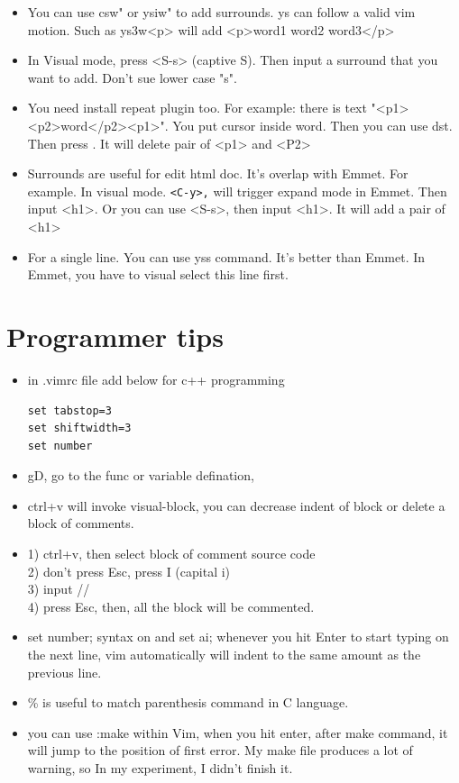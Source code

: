 \documentclass[a4paper,12pt,twoside]{book}
\begin{document}
\begin{itemize}
	   \item You can use csw" or ysiw" to add surrounds. ys can follow a valid vim motion. Such as ys3w<p> will add <p>word1 word2 word3</p>
	   \item In Visual mode, press <S-s> (captive S). Then input a surround that you want to add. Don't sue lower case "s". 
	   \item You need install repeat plugin too. For example: there is text "<p1><p2>word</p2><p1>". You put cursor inside word. Then you can use dst. Then press . It will delete pair of <p1> and <P2>
	    
	    \item Surrounds are useful for edit html doc. It's overlap with Emmet. For example. In visual mode. \verb=<C-y>,= will trigger expand mode in Emmet. Then input <h1>. Or you can use <S-s>, then input <h1>. It will add a pair of <h1> 
	    \item For a single line. You can use yss command. It's better than Emmet. In Emmet, you have to visual select this line first.  
\end{itemize}


\section{Programmer tips}
\begin{itemize}
 	\item in .vimrc file add below for c++ programming
	\begin{verbatim}
set tabstop=3
set shiftwidth=3
set number	
	\end{verbatim}
	 
	\item gD, go to the func or variable defination, \\

	 \item ctrl+v will invoke visual-block, you can decrease indent of block or delete a block of comments. 
	 
	 \item 1) ctrl+v, then select block of comment source code \\
	           2) don't press Esc, press I (capital i) \\
	           3) input // \\
	           4) press Esc, then, all the block will be commented.

	 \item set number; syntax on and set ai;  whenever you hit Enter to start typing on the next line, vim automatically will indent to the same amount as the previous line.

	 \item \% is useful to match parenthesis command in C language. 
	 \item you can use :make within Vim, when you hit enter, after make command, it will jump to the position of first error. My make file produces a lot of warning, so In my experiment, I didn't finish it.  
	 
\end{itemize}
\end{document}
